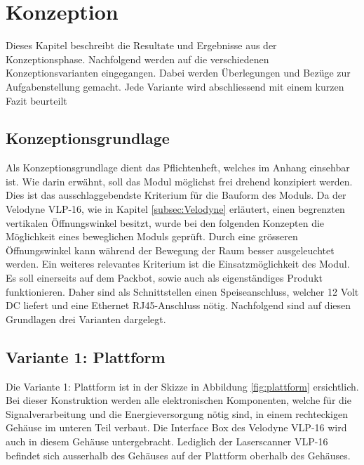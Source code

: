 \chapter{Konzeption}
\label{chap:Konzeption}

Dieses Kapitel beschreibt die Resultate und Ergebnisse aus der Konzeptionsphase. Nachfolgend werden auf die verschiedenen Konzeptionsvarianten eingegangen. Dabei werden Überlegungen und Bezüge zur Aufgabenstellung gemacht. Jede Variante wird abschliessend mit einem kurzen Fazit beurteilt

\section{Konzeptionsgrundlage}
\label{sec:Konzeptiongrund}
Als Konzeptionsgrundlage dient das Pflichtenheft, welches im Anhang  einsehbar ist. Wie darin erwähnt, soll das Modul möglichst frei drehend konzipiert werden. Dies ist das ausschlaggebendste Kriterium für die Bauform des Moduls. Da der Velodyne VLP-16, wie in Kapitel \ref{subsec:Velodyne} erläutert, einen begrenzten vertikalen Öffnungswinkel besitzt, wurde bei den folgenden Konzepten die Möglichkeit eines beweglichen Moduls geprüft. Durch eine grösseren Öffnungswinkel kann während der Bewegung der Raum besser ausgeleuchtet werden. Ein weiteres relevantes Kriterium ist die Einsatzmöglichkeit des Modul. Es soll einerseits auf dem Packbot, sowie auch als eigenständiges Produkt funktionieren. Daher sind als Schnittstellen einen Speiseanschluss, welcher 12 Volt DC liefert und eine Ethernet RJ45-Anschluss nötig. Nachfolgend sind auf diesen Grundlagen drei Varianten dargelegt.

\section {Variante 1: Plattform}
\label{sec:var1}
Die Variante 1: Plattform ist in der Skizze in Abbildung \ref{fig:plattform} ersichtlich. Bei dieser Konstruktion werden alle elektronischen Komponenten, welche für die Signalverarbeitung und die Energieversorgung nötig sind, in einem rechteckigen Gehäuse im unteren Teil verbaut. Die Interface Box des Velodyne VLP-16 wird auch in diesem Gehäuse untergebracht. Lediglich der Laserscanner VLP-16 befindet sich ausserhalb des Gehäuses auf der Plattform oberhalb des Gehäuses.

